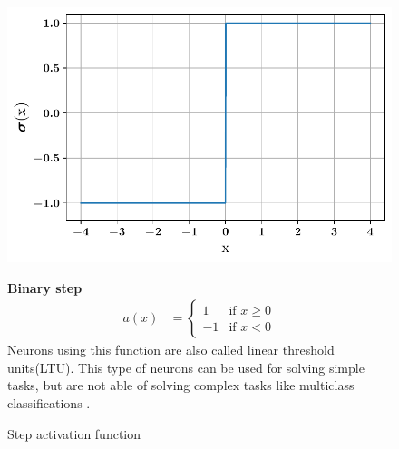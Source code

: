 \begin{figure}[!h]
\begin{minipage}{0.45\textwidth}

    \centering
\includegraphics[width=\textwidth]{images/networks/act_step.pdf}
\caption{Step activation function}
    \label{fig:act_step}
\end{minipage}
\hfill
\begin{minipage}{0.5\textwidth}
    \textbf{Binary step}
      \begin{align}
        a(x) &=
        \begin{cases}
        1   & \text{if } x \geq 0 \\
        -1  & \text{if } x < 0 
  \end{cases}
\end{align}
Neurons using this function are also called linear threshold units(LTU). This type of neurons can be used for solving simple tasks, but are not able of solving complex tasks like multiclass classifications .
\end{minipage}
    \end{figure}

